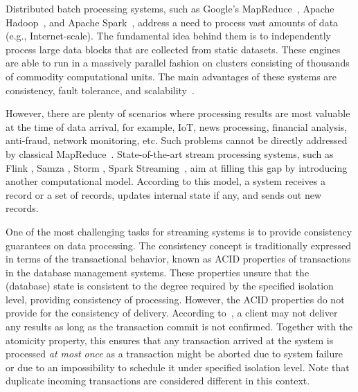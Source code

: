 
\label {fs-intro-seciton}

Distributed batch processing systems, such as Google's MapReduce~\cite{Dean:2008:MSD:1327452.1327492}, Apache Hadoop~\cite{hadoop2009hadoop}, and Apache Spark~\cite{Zaharia:2016:ASU:3013530.2934664}, address a need to process vast amounts of data (e.g., Internet-scale). The fundamental idea behind them is to independently process large data blocks that are collected from static datasets. These engines are able to run in a massively parallel fashion on clusters consisting of thousands of commodity computational units. The main advantages of these systems are consistency, fault tolerance, and scalability~\cite{borthakur2011apache}.

However, there are plenty of scenarios where processing results are most valuable at the time of data arrival, for example, IoT, news processing, financial analysis, anti-fraud, network monitoring, etc. Such problems cannot be directly addressed by classical MapReduce~\cite{Doulkeridis:2014:SLA:2628707.2628782}. State-of-the-art stream processing systems, such as Flink \cite{carbone2015apache}, Samza \cite{Noghabi:2017:SSS:3137765.3137770}, Storm \cite{apache:storm}, Spark Streaming~\cite{Zaharia:2012:DSE:2342763.2342773}, aim at filling this gap by introducing another computational model. According to this model, a system receives a record or a set of records, updates internal state if any, and sends out new records. 

One of the most challenging tasks for streaming systems is to provide consistency guarantees on data processing. 
The consistency concept is traditionally expressed in terms of the transactional behavior, known as ACID properties of transactions in the database management systems. These properties unsure that the (database) state is consistent to the degree required by the specified isolation level, providing consistency of processing.   However, the ACID properties do not provide for the consistency of delivery.  According to~\cite{DBLP:books/mk/WeikumV2002}, a client may not deliver any results as long as the transaction commit is not confirmed. Together with the atomicity property, this ensures that any transaction arrived at the system is processed  {\em at most once} as a transaction might be aborted due to system failure or due to an impossibility to schedule it under specified isolation level. Note that duplicate incoming transactions are considered different in this context.   

